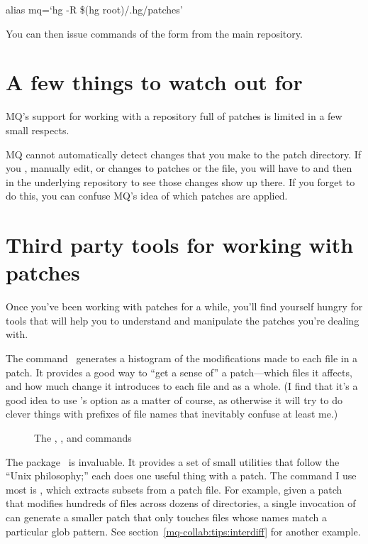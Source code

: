 \begin{codesample2}
  alias mq=`hg -R \$(hg root)/.hg/patches'
\end{codesample2}

You can then issue commands of the form  from
the main repository.

\section{A few things to watch out for}

MQ's support for working with a repository full of patches is limited
in a few small respects.

MQ cannot automatically detect changes that you make to the patch
directory.  If you , manually edit, or 
changes to patches or the  file, you will have to
 and then
 in the underlying repository to
see those changes show up there.  If you forget to do this, you can
confuse MQ's idea of which patches are applied.

\section{Third party tools for working with patches}
\label{sec:mq:tools}

Once you've been working with patches for a while, you'll find
yourself hungry for tools that will help you to understand and
manipulate the patches you're dealing with.

The  command~\cite{web:diffstat} generates a
histogram of the modifications made to each file in a patch.  It
provides a good way to ``get a sense of'' a patch---which files it
affects, and how much change it introduces to each file and as a
whole.  (I find that it's a good idea to use 's
 option as a matter of course, as otherwise it
will try to do clever things with prefixes of file names that
inevitably confuse at least me.)

\begin{figure}[ht]
  \caption{The , , and  commands}
  \label{ex:mq:tools}
\end{figure}

The  package~\cite{web:patchutils} is invaluable.
It provides a set of small utilities that follow the ``Unix
philosophy;'' each does one useful thing with a patch.  The
 command I use most is , which
extracts subsets from a patch file.  For example, given a patch that
modifies hundreds of files across dozens of directories, a single
invocation of  can generate a smaller patch that
only touches files whose names match a particular glob pattern.  See
section~\ref{mq-collab:tips:interdiff} for another example.

